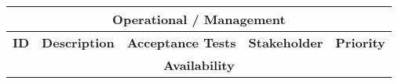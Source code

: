 \begin{tabular}{|l|l|l|l|l|} 
	\hline
	\multicolumn{5}{c}{\textbf{Operational / Management}}                                                                                                                                                                                                                                                                                                                                                                                                                                                                                                                                                                                                                                                                                                                           \\ 
	\hline
	\textbf{ID} & \textbf{Description}                                                                                                                                                                                                                & \textbf{Acceptance Tests}                                                                                                                                                                                                                                                                                                                                                                                                        & \textbf{Stakeholder}                                                  & \textbf{Priority}  \\ 
	\hline
	\multicolumn{5}{c}{\textbf{Availability}}                                                                                                                                                                                                                                                                                                                                                                                                                                                                                                                                                                                                                                                                                                                                       \\ 
	\hline

\end{tabular}
